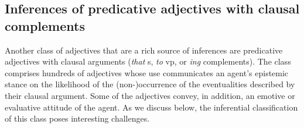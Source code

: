 \documentclass[10pt]{article}
\begin{document}
%
%

\subsection{Inferences of predicative adjectives with clausal complements}

Another class of adjectives that are a rich source of inferences are predicative adjectives with clausal arguments (\emph{that} {\sc s}, \emph{to} {\sc vp}, or \emph{ing} complements). The class comprises hundreds of adjectives whose use communicates an agent's epistemic stance on the likelihood of the (non-)occurrence of the eventualities described by their clausal argument. Some of the adjectives convey, in addition, an emotive or evaluative attitude of the agent. As we discuss below, the inferential classification of this class poses interesting challenges.
\end{document}
